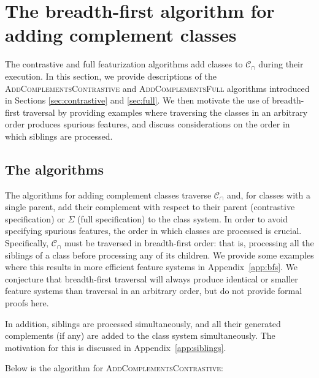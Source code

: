 \documentclass[11pt, oneside]{article}   	%
\begin{document}
\section{The breadth-first algorithm for adding complement classes}
\label{app:complements}

The contrastive and full featurization algorithms add classes to $\mathcal{C_\cap}$ during their execution. In this section, we provide descriptions of the \textsc{AddComplementsContrastive} and \textsc{AddComplementsFull} algorithms introduced in Sections \ref{sec:contrastive} and \ref{sec:full}. We then motivate the use of breadth-first traversal by providing examples where traversing the classes in an arbitrary order produces spurious features, and discuss considerations on the order in which siblings are processed.

\subsection{The algorithms}

The algorithms for adding complement classes traverse $\mathcal{C_\cap}$ and, for classes with a single parent, add their complement with respect to their parent (contrastive specification) or $\Sigma$ (full specification) to the class system. In order to avoid specifying spurious features, the order in which classes are processed is crucial. Specifically, $\mathcal{C_\cap}$ must be traversed in breadth-first order: that is, processing all the siblings of a class before processing any of its children. We provide some examples where this results in more efficient feature systems in Appendix~\ref{app:bfs}. We conjecture that breadth-first traversal will always produce identical or smaller feature systems than traversal in an arbitrary order, but do not provide formal proofs here. 

In addition, siblings are processed simultaneously, and all their generated complements (if any) are added to the class system simultaneously. The motivation for this is discussed in Appendix~\ref{app:siblings}.

Below is the algorithm for \textsc{AddComplementsContrastive}:
\end{document}
